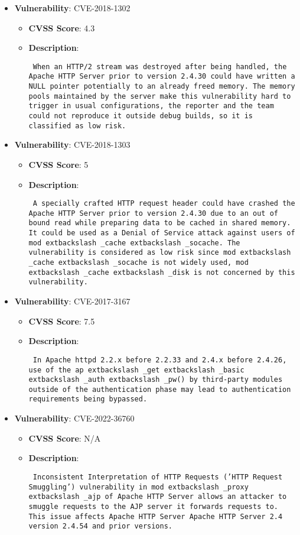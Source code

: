 \documentclass{article}
\begin{document}
\begin{itemize}
        \item \textbf{Vulnerability}: CVE-2018-1302
        \begin{itemize}
            \item \textbf{CVSS Score}:  4.3 
            \item \textbf{Description}: \parbox{\linewidth}{\texttt{ When an HTTP/2 stream was destroyed after being handled, the Apache HTTP Server prior to version 2.4.30 could have written a NULL pointer potentially to an already freed memory. The memory pools maintained by the server make this vulnerability hard to trigger in usual configurations, the reporter and the team could not reproduce it outside debug builds, so it is classified as low risk. }}
        \end{itemize}
    
        \item \textbf{Vulnerability}: CVE-2018-1303
        \begin{itemize}
            \item \textbf{CVSS Score}:  5 
            \item \textbf{Description}: \parbox{\linewidth}{\texttt{ A specially crafted HTTP request header could have crashed the Apache HTTP Server prior to version 2.4.30 due to an out of bound read while preparing data to be cached in shared memory. It could be used as a Denial of Service attack against users of mod	extbackslash _cache	extbackslash _socache. The vulnerability is considered as low risk since mod	extbackslash _cache	extbackslash _socache is not widely used, mod	extbackslash _cache	extbackslash _disk is not concerned by this vulnerability. }}
        \end{itemize}
    
        \item \textbf{Vulnerability}: CVE-2017-3167
        \begin{itemize}
            \item \textbf{CVSS Score}:  7.5 
            \item \textbf{Description}: \parbox{\linewidth}{\texttt{ In Apache httpd 2.2.x before 2.2.33 and 2.4.x before 2.4.26, use of the ap	extbackslash _get	extbackslash _basic	extbackslash _auth	extbackslash _pw() by third-party modules outside of the authentication phase may lead to authentication requirements being bypassed. }}
        \end{itemize}
    
        \item \textbf{Vulnerability}: CVE-2022-36760
        \begin{itemize}
            \item \textbf{CVSS Score}:  N/A 
            \item \textbf{Description}: \parbox{\linewidth}{\texttt{ Inconsistent Interpretation of HTTP Requests ('HTTP Request Smuggling') vulnerability in mod	extbackslash _proxy	extbackslash _ajp of Apache HTTP Server allows an attacker to smuggle requests to the AJP server it forwards requests to.  This issue affects Apache HTTP Server Apache HTTP Server 2.4 version 2.4.54 and prior versions. }}
        \end{itemize}
    

\end{itemize}
\end{document}
